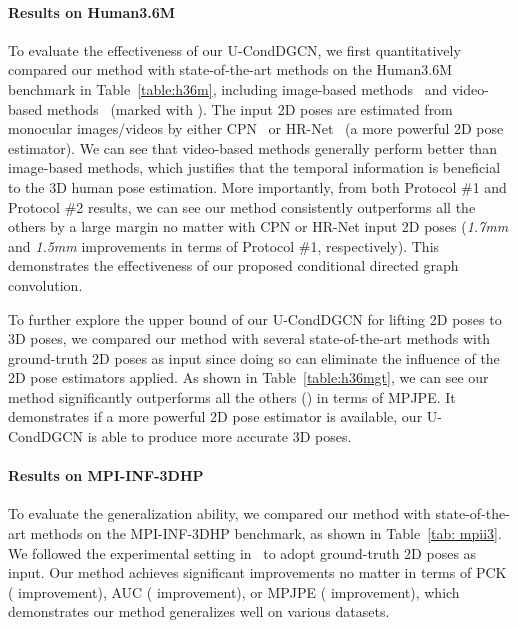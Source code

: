 \documentclass[sigconf]{acmart}
\begin{document}
\paragraph{Results on Human3.6M}
To evaluate the effectiveness of our U-CondDGCN, we first quantitatively compared our method with state-of-the-art methods on the Human3.6M benchmark in Table~\ref{table:h36m}, including image-based methods~\cite{martinez2017simple,fang2018learning,zhao2019semantic,liu2020comprehensive} and video-based methods~\cite{cai2019exploiting,pavllo20193d,xu2020deep,liu2020attention,wang2020motion} (marked with ).
The input 2D poses are estimated from monocular images/videos by either CPN~\cite{chen2018cascaded} or HR-Net~\cite{sun2019deep} (a more powerful 2D pose estimator).
We can see that video-based methods generally perform better than image-based methods, which justifies that the temporal information is beneficial to the 3D human pose estimation.
More importantly, from both Protocol \#1 and Protocol \#2 results, we can see our method consistently outperforms all the others by a large margin no matter with CPN or HR-Net input 2D poses (\emph{1.7mm} and \emph{1.5mm} improvements in terms of Protocol \#1, respectively).
This demonstrates the effectiveness of our proposed conditional directed graph convolution.


To further explore the upper bound of our U-CondDGCN for lifting 2D poses to 3D poses, we compared our method with several state-of-the-art methods with ground-truth 2D poses as input since doing so can eliminate the influence of the 2D pose estimators applied.
As shown in Table~\ref{table:h36mgt}, we can see our method significantly outperforms all the others () in terms of MPJPE.
It demonstrates if a more powerful 2D pose estimator is available, our U-CondDGCN is able to produce more accurate 3D poses.







\vspace{-2mm}
\paragraph{Results on MPI-INF-3DHP}
To evaluate the generalization ability, we compared our method with state-of-the-art methods on the MPI-INF-3DHP benchmark, as shown in Table~\ref{tab: mpii3}.
We followed the experimental setting in~\cite{lin2019trajectory,wang2020motion} to adopt ground-truth 2D poses as input.
Our method achieves significant improvements no matter in terms of PCK ( improvement), AUC ( improvement), or MPJPE ( improvement), which demonstrates our method generalizes well on various datasets.
\end{document}
